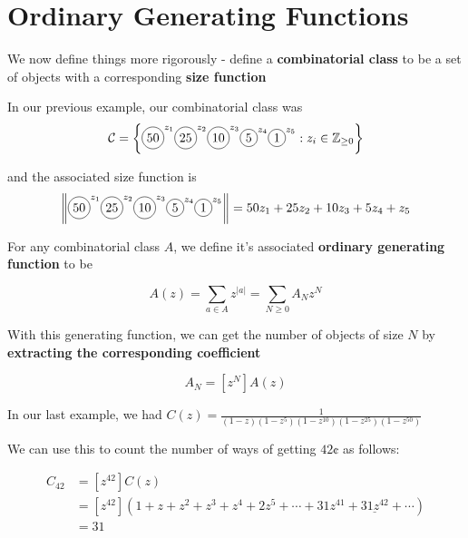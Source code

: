 \documentclass[aspectratio=169]{beamer}
\newcommand*\circled[1]{\tikz[baseline=(char.base)]{
            \node[shape=circle,draw,inner sep=2pt] (char) {#1};}}
\newcommand{\CP}{\circled{1}}
\newcommand{\CN}{\circled{5}}
\newcommand{\CD}{\circled{10}}
\newcommand{\CQ}{\circled{25}}
\newcommand{\CH}{\circled{50}}
\begin{document}

\section{Ordinary Generating Functions}
\frame{\sectionpage}

\begin{frame}
We now define things more rigorously - define a \textbf{combinatorial class} to be a set of objects with a corresponding \textbf{size function}

\vspace{25pt}

In our previous example, our combinatorial class was $$ \mathcal{C} = \left\{ \CH^{z_1} \CQ^{z_2} \CD^{z_3} \CN^{z_4} \CP^{z_5} : z_i \in \mathbb{Z}_{\ge0} \right\}  $$

\vspace{25pt}

and the associated size function is $$ \left\|\CH^{z_1} \CQ^{z_2} \CD^{z_3} \CN^{z_4} \CP^{z_5} \right\| = 50z_1 + 25z_2 + 10z_3 + 5z_4 + z_5 $$


\end{frame}

\begin{frame}

For any combinatorial class $A$, we define it's associated \textbf{ordinary generating function} to be

$$ A(z) = \sum_{ a \in A } z^{|a|} = \sum_{N \ge 0} A_N z^N $$ 

\pause
\vspace{25pt}


With this generating function, we can get the number of objects of size $N$ by \textbf{extracting the corresponding coefficient}

$$ A_N = [z^N] A(z) $$

\end{frame}

\begin{frame}

In our last example, we had  $ C(z) = \frac{1}{(1-z)(1-z^5)(1-z^{10})(1-z^{25})(1-z^{50})}$ 

We can use this to count the number of ways of getting $42 \cent$ as follows:

\begin{align*}
C_{42} &= [z^{42}] C(z) \\
&= [z^{42}] \left( 1 + z + z^2 + z^3 + z^4 + 2z^5 + \cdots + 31 z^{41} + \underline{31 z^{42}} + \cdots \right) \\
&= 31
\end{align*}

\end{frame}
\end{document}
